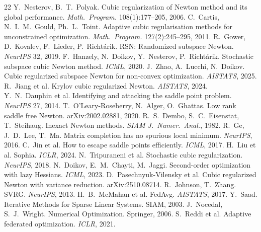 \documentclass[11pt,a4paper]{article}
\theoremstyle{definition}
\begin{document}
\begin{thebibliography}{22}
 Y.~Nesterov, B.~T.~Polyak.
Cubic regularization of Newton method and its global performance.
\textit{Math.\ Program.} 108(1):177--205, 2006.
 C.~Cartis, N.~I.~M.~Gould, Ph.~L.~Toint.
Adaptive cubic regularisation methods for unconstrained optimization.
\textit{Math.\ Program.} 127(2):245--295, 2011.
 R.~Gower, D.~Kovalev, F.~Lieder, P.~Richt\'arik.
RSN: Randomized subspace Newton. \textit{NeurIPS} 32, 2019.
 F.~Hanzely, N.~Doikov, Y.~Nesterov, P.~Richt\'arik.
Stochastic subspace cubic Newton method. \textit{ICML}, 2020.
 J.~Zhao, A.~Lucchi, N.~Doikov.
Cubic regularized subspace Newton for non-convex optimization.
\textit{AISTATS}, 2025.
 R.~Jiang et al.
Krylov cubic regularized Newton. \textit{AISTATS}, 2024.
 Y.~N.~Dauphin et al.
Identifying and attacking the saddle point problem.
\textit{NeurIPS} 27, 2014.
 T.~O'Leary-Roseberry, N.~Alger, O.~Ghattas.
Low rank saddle free Newton. arXiv:2002.02881, 2020.
 R.~S.~Dembo, S.~C.~Eisenstat, T.~Steihaug.
Inexact Newton methods. \textit{SIAM J.\ Numer.\ Anal.}, 1982.
 R.~Ge, J.~D.~Lee, T.~Ma.
Matrix completion has no spurious local minimum. \textit{NeurIPS}, 2016.
 C.~Jin et al. How to escape saddle points efficiently.
\textit{ICML}, 2017.
 H.~Liu et al. Sophia. \textit{ICLR}, 2024.
 N.~Tripuraneni et al.
Stochastic cubic regularization. \textit{NeurIPS}, 2018.
 N.~Doikov, E.~M.~Chayti, M.~Jaggi.
Second-order optimization with lazy Hessians. \textit{ICML}, 2023.
 D.~Pasechnyuk-Vilensky et al.
Cubic regularized Newton with variance reduction. arXiv:2510.08714.
 R.~Johnson, T.~Zhang. SVRG. \textit{NeurIPS}, 2013.
 H.~B.~McMahan et al. FedAvg. \textit{AISTATS}, 2017.
 Y.~Saad. Iterative Methods for Sparse Linear Systems. SIAM, 2003.
 J.~Nocedal, S.~J.~Wright. Numerical Optimization. Springer, 2006.
 S.~Reddi et al. Adaptive federated optimization. \textit{ICLR}, 2021.
\end{thebibliography}
\end{document}

